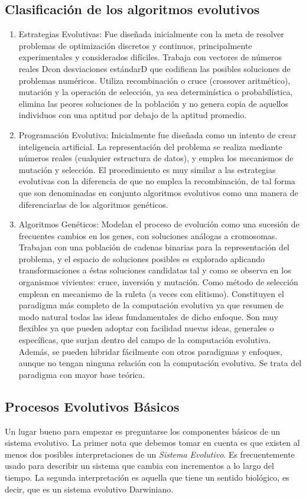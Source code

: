 \documentclass{article}
\begin{document}
\subsection{Clasificación de los algoritmos evolutivos}
\begin{enumerate}
    \item Estrategias Evolutivas:
Fue diseñada inicialmente
con la meta de resolver problemas de optimización discretos y continuos,
principalmente experimentales y considerados difíciles. Trabaja con vectores de
números reales Dcon desviaciones estándarD que codifican las posibles soluciones de
problemas numéricos. Utiliza recombinación o cruce (crossover aritmético), mutación y
la operación de selección, ya sea determinística o probabilística, elimina las peores
soluciones de la población y no genera copia de aquellos individuos con una aptitud por
debajo de la aptitud promedio.
  \item{Programación Evolutiva:}
  Inicialmente fue diseñada como un intento de crear inteligencia artificial.
La representación del problema se realiza mediante números reales (cualquier estructura
de datos), y emplea los mecanismos de mutación y selección. El procedimiento es muy
similar a las estrategias evolutivas con la diferencia de que no emplea la recombinación,
de tal forma que son denominadas en conjunto algoritmos evolutivos como una manera
de diferenciarlas de los algoritmos genéticos. 
\item{Algoritmos Genéticos:}
Modelan el proceso de evolución como una sucesión de
frecuentes cambios en los genes, con soluciones análogas a cromosomas. Trabajan con
una población de cadenas binarias para la representación del problema, y el espacio de
soluciones posibles es explorado aplicando transformaciones a éstas soluciones
candidatas tal y como se observa en los organismos vivientes: cruce, inversión y
mutación. Como método de selección emplean en mecanismo de la ruleta (a veces con
elitismo). Constituyen el paradigma más completo de la computación evolutiva ya que 
resumen de modo natural todas las ideas fundamentales de dicho enfoque. Son muy
flexibles ya que pueden adoptar con facilidad nuevas ideas, generales o específicas, que
surjan dentro del campo de la computación evolutiva. Además, se pueden hibridar
fácilmente con otros paradigmas y enfoques, aunque no tengan ninguna relación con la
computación evolutiva. Se trata del paradigma con mayor base teórica.
\end{enumerate}
\subsection{Procesos Evolutivos B\'asicos}
Un lugar bueno para empezar es preguntarse los componentes b\'asicos de un sistema evolutivo. La primer nota que debemos tomar en cuenta es que existen al menos dos posibles interpretaciones de un \textit{Sistema Evolutivo}. Es frecuentemente usado para describir un sistema que cambia con incrementos a lo largo del tiempo. La segunda interpretaci\'on es aquella que tiene un sentido biol\'ogico, es decir, que es un sistema evolutivo Darwiniano.
\end{document}
